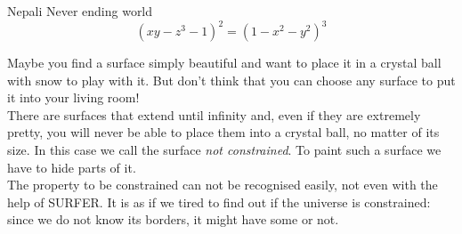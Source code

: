 \begin{surferPage}{Nepali}
Never ending world \\

\smallskip
\[(x y - z^3 -1)^2= (1 - x^2	- y^2)^3\]

\singlespacing
Maybe you find a surface simply beautiful and want to place it in a crystal ball with snow to play with it. But don't think that you can choose any surface to put it into your living room!
\\
\singlespacing
There are surfaces that extend until infinity and, even if they are extremely pretty, you will never be able to place them into a crystal ball, no matter of its size. In this case we call the surface \textit{not constrained}. To paint such a surface we have to hide parts of it.
\\
\singlespacing
The property to be constrained can not be recognised easily, not even with the help of SURFER. It is as if we tired to find out if the universe is constrained: since we do not know its borders, it might have some or not.
\end{surferPage}
